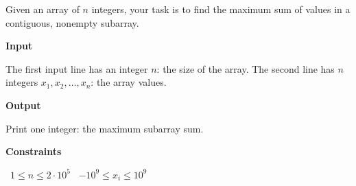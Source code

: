 Given an array of $n$ integers, your task is to find the maximum sum of values in a contiguous, nonempty subarray.

\vspace{0.3cm}\noindent\textbf{Input}

The first input line has an integer $n$: the size of the array.
The second line has $n$ integers $x_1,x_2,\dots,x_n$: the array values.

\vspace{0.3cm}\noindent\textbf{Output}

Print one integer: the maximum subarray sum.

\vspace{0.3cm}\noindent\textbf{Constraints}

\textbullet\ $1 \le n \le 2 \cdot 10^5$
\textbullet\ $-10^9 \le x_i \le 10^9$